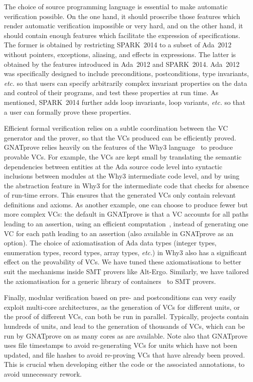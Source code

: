 \documentclass[sttt,final]{svjour}
\newcommand{\gnatprove}{GNATprove\xspace}
\newcommand{\newspark}{SPARK~2014\xspace}
\newcommand{\adatwtw}{Ada~2012\xspace}
\newcommand{\etc}{\textit{etc.}\xspace}
\begin{document}
The choice of source programming language is essential to make
automatic verification possible. On the one hand, it should proscribe
those features which render automatic verification impossible or very
hard, and on the other hand, it should contain enough features which
facilitate the expression of specifications. The former is obtained by
restricting \newspark to a subset of \adatwtw without pointers,
exceptions, aliasing, and effects in expressions. The latter is
obtained by the features introduced in \adatwtw and
\newspark. \adatwtw was specifically designed to include
preconditions, postconditions, type invariants, \etc so that users can
specify arbitrarily complex invariant properties on the data and
control of their programs, and test these properties at run time. As
mentioned, \newspark further adds loop invariants, loop variants, \etc
so that a user can formally prove these properties.

Efficient formal verification relies on a subtle coordination between
the VC generator and the prover, so that the VCs produced can be
efficiently proved. \gnatprove relies heavily on the features of the
Why3 language~\cite{guitton2011boogie} to produce provable VCs. For
example, the VCs are kept small by translating the semantic
dependencies between entities at the Ada source code level into
syntactic inclusions between modules at the Why3 intermediate code
level, and by using the abstraction feature in Why3 for the
intermediate code that checks for absence of run-time errors. This
ensures that the generated VCs only contain relevant definitions and
axioms. As another example, one can choose to produce fewer but more
complex VCs: the default in \gnatprove is that a VC accounts for all
paths leading to an assertion, using an efficient
computation~\cite{leino2005ipl}, instead of generating one VC for each
path leading to an assertion (also available in \gnatprove as an
option). The choice of axiomatisation of Ada data types (integer
types, enumeration types, record types, array types, \etc) in Why3
also has a significant effect on the provability of VCs. We have tuned
these axiomatisations to better suit the mechanisms inside SMT provers
like Alt-Ergo. Similarly, we have tailored the axiomatisation for a
generic library of containers~\cite{dross:2011:tap} to SMT provers.

Finally, modular verification based on pre- and postconditions can
very easily exploit multi-core architectures, as the generation of VCs
for different units, or the proof of different VCs, can both be run in
parallel. Typically, projects contain hundreds of units, and lead to
the generation of thousands of VCs, which can be run by \gnatprove on
as many cores as are available. Note also that \gnatprove uses file
timestamps to avoid re-generating VCs for units which have not been
updated, and file hashes to avoid re-proving VCs that have already
been proved. This is crucial when developing either the code or the
associated annotations, to avoid unnecessary rework.
\end{document}
